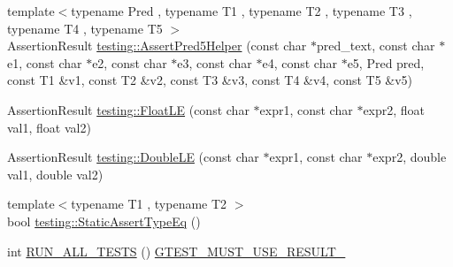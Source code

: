 \begin{DoxyCompactItemize}
\item 
{\footnotesize template$<$typename Pred , typename T1 , typename T2 , typename T3 , typename T4 , typename T5 $>$ }\\Assertion\-Result \hyperlink{namespacetesting_addcf52b273ce17269cbf4956cfe600a6}{testing\-::\-Assert\-Pred5\-Helper} (const char $\ast$pred\-\_\-text, const char $\ast$e1, const char $\ast$e2, const char $\ast$e3, const char $\ast$e4, const char $\ast$e5, Pred pred, const T1 \&v1, const T2 \&v2, const T3 \&v3, const T4 \&v4, const T5 \&v5)
\item 
Assertion\-Result \hyperlink{namespacetesting_a2c9a2a391c72a7b02ea3024586e33af0}{testing\-::\-Float\-L\-E} (const char $\ast$expr1, const char $\ast$expr2, float val1, float val2)
\item 
Assertion\-Result \hyperlink{namespacetesting_ae10e2bb304b74abd1b06a2d912a8b43b}{testing\-::\-Double\-L\-E} (const char $\ast$expr1, const char $\ast$expr2, double val1, double val2)
\item 
{\footnotesize template$<$typename T1 , typename T2 $>$ }\\bool \hyperlink{namespacetesting_a661e70fc6afeb5c085eed3716aa45059}{testing\-::\-Static\-Assert\-Type\-Eq} ()
\item 
int \hyperlink{fused-src_2gtest_2gtest_8h_a853a3792807489591d3d4a2f2ff9359f}{R\-U\-N\-\_\-\-A\-L\-L\-\_\-\-T\-E\-S\-T\-S} () \hyperlink{gtest-port_8h_a8e5aab8276b2645f64f41c9e3021b935}{G\-T\-E\-S\-T\-\_\-\-M\-U\-S\-T\-\_\-\-U\-S\-E\-\_\-\-R\-E\-S\-U\-L\-T\-\_\-}
\end{DoxyCompactItemize}
